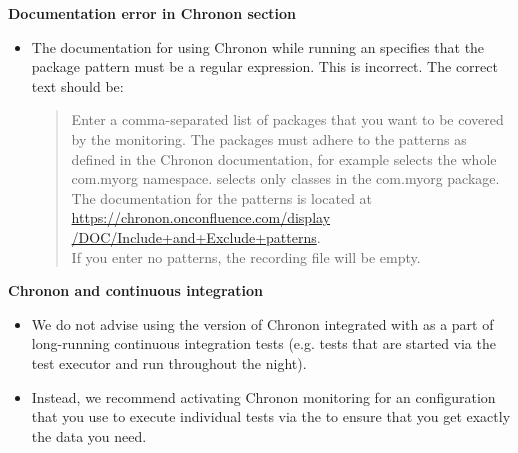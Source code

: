 \textbf{Documentation error in Chronon section}
\begin{itemize}
\item The documentation for using Chronon while running an \gdaut{} specifies that the package pattern must be a regular expression. This is incorrect. The correct text should be: 
\begin{quote}Enter a comma-separated list of packages that you want to be covered by the monitoring. The packages must adhere to the patterns as defined in the Chronon documentation, for example  selects the whole com.myorg namespace.  selects only classes in the com.myorg package. The documentation for the patterns is located at \\
\href{https://chronon.onconfluence.com/display/DOC/Include+and+Exclude+patterns}{https://chronon.onconfluence.com/display\\
/DOC/Include+and+Exclude+patterns}.\\
 If you enter no patterns, the recording file will be empty.
\end{quote}
\end{itemize}

\textbf{Chronon and continuous integration}
\begin{itemize}
\item We do not advise using the version of Chronon integrated with \app{} as a part of long-running continuous integration tests (e.g. tests that are started via the test executor and run throughout the night).  
\item Instead, we recommend activating Chronon monitoring for an \gdaut{} configuration that you use to execute individual tests via the \ite{} to ensure that you get exactly the data you need.
\end{itemize}
